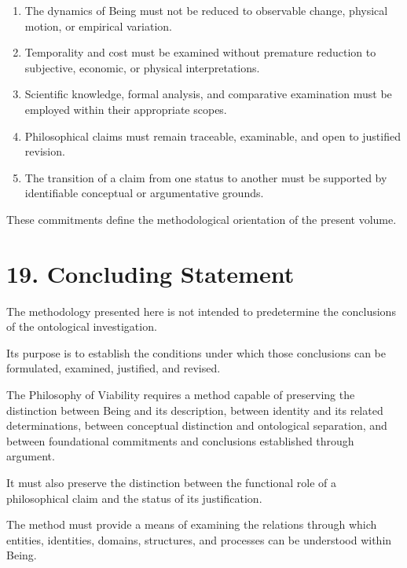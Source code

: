 \begin{enumerate}
    \item The dynamics of
    Being must not be reduced
    to observable change,
    physical motion, or
    empirical variation.

    \item Temporality and cost
    must be examined without
    premature reduction to
    subjective, economic,
    or physical interpretations.

    \item Scientific knowledge,
    formal analysis, and
    comparative examination
    must be employed within
    their appropriate scopes.

    \item Philosophical claims
    must remain traceable,
    examinable, and open
    to justified revision.

    \item The transition of
    a claim from one status
    to another must be
    supported by identifiable
    conceptual or argumentative
    grounds.

\end{enumerate}

These commitments define
the methodological orientation
of the present volume.


\section*{19. Concluding Statement}

The methodology presented
here is not intended to
predetermine the conclusions
of the ontological investigation.

Its purpose is to establish
the conditions under which
those conclusions can be
formulated, examined,
justified, and revised.

The Philosophy of Viability
requires a method capable
of preserving the distinction
between Being and its description,
between identity and its
related determinations,
between conceptual distinction
and ontological separation,
and between foundational
commitments and conclusions
established through argument.

It must also preserve the
distinction between the
functional role of a philosophical
claim and the status of
its justification.

The method must provide
a means of examining the
relations through which
entities, identities, domains,
structures, and processes
can be understood within
Being.

